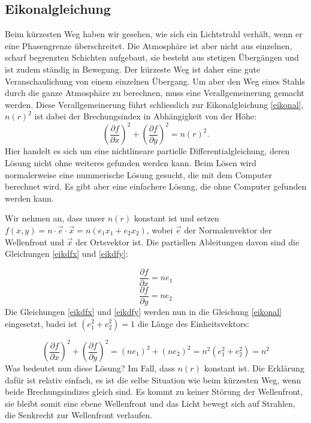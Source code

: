 \begin{refsection}
\section{Eikonalgleichung}
%
Beim kürzesten Weg haben wir gesehen, wie sich ein Lichtstrahl
verhält, wenn er eine Phasengrenze überschreitet. Die Atmosphäre
ist aber nicht aus einzelnen, scharf begrenzten Schichten aufgebaut,
sie besteht aus stetigen Übergängen und ist zudem ständig in
Bewegung. Der kürzeste Weg ist daher eine gute Veranschaulichung
von einem einzelnen Übergang. Um aber den Weg eines Stahls durch die
ganze Atmosphäre zu berechnen, muss eine Verallgemeinerung gemacht
werden. Diese Verallgemeinerung führt schliesslich zur Eikonalgleichung
\eqref{eikonal}, $n(r)^{2}$ ist dabei der Brechungsindex in Abhängigkeit
von der Höhe:
\begin{equation}\label{eikonal}
\left( \dfrac{\partial f}{\partial x}\right)^{2} + \left( \dfrac{\partial f}{\partial y}\right) ^{2} = n(r)^{2}.
\end{equation}
Hier handelt  es sich um eine nichtlineare partielle
Differentialgleichung, deren Lösung nicht ohne weiteres gefunden werden
kann. Beim Lösen wird normalerweise eine nummerische Lösung gesucht,
die mit dem Computer berechnet wird. Es gibt aber eine einfachere
Lösung, die ohne Computer gefunden werden kann.

Wir nehmen an, dass
unser $n(r)$ konstant ist und setzen $f(x,y)=n\cdot\vec{e}\cdot\vec{x}=
n(e_{1}x_{1}+e_{2}x_{2})$, wobei $\vec{e}$ der Normalenvektor der
Wellenfront und $\vec{x}$ der Ortsvektor ist. Die partiellen Ableitungen
davon sind die Gleichungen \eqref{eikdfx} und \eqref{eikdfy}:

\begin{equation}\label{eikdfx}
\dfrac{\partial f}{\partial x} = ne_{1}
\end{equation}
\begin{equation}\label{eikdfy}
\dfrac{\partial f}{\partial y} = ne_{2}
\end{equation}
Die Gleichungen \eqref{eikdfx} und \eqref{eikdfy} werden nun in die Gleichung \eqref{eikonal} eingesetzt, badei ist $(e_{1}^{2}+e_{2}^{2})=1$ die Länge des Einheitsvektors:

\begin{equation}\label{lösung_eik}
\left( \dfrac{\partial f}{\partial x}\right)^{2} + \left( \dfrac{\partial f}{\partial y}\right) ^{2} = \left( ne_{1}\right) ^{2}+\left( ne_{2}\right)^{2}=n^{2}(e_{1}^{2}+e_{2}^{2})=n^{2}
\end{equation}
Was bedeutet nun diese Lösung? Im Fall, dass $n(r)$ konstant ist. Die Erklärung dafür ist relativ einfach, es ist die selbe Situation wie beim kürzesten Weg, wenn beide Brechungsindizes gleich sind. Es kommt zu keiner Störung der Wellenfront, sie bleibt somit eine ebene Wellenfront und das Licht bewegt sich auf Strahlen, die Senkrecht zur Wellenfront verlaufen.


\end{refsection}
